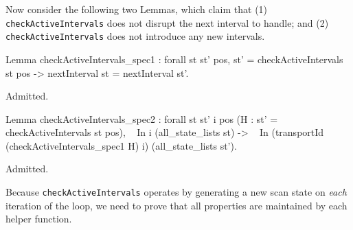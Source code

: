 \documentclass{llncs}
\newenvironment{MyCoqExampleStar}{\small \verbatim}{\endverbatim \normalsize}
\begin{document}



Now consider the following two Lemmas, which claim that (1)
\texttt{checkActiveIntervals} does not disrupt the next interval to handle;
and (2) \texttt{checkActiveIntervals} does not introduce any new intervals.


\begin{MyCoqExampleStar}
Lemma checkActiveIntervals_spec1 : forall st st' pos,
  st' = checkActiveIntervals st pos
    -> nextInterval st = nextInterval st'.
\end{MyCoqExampleStar}
\begin{MyCoqEval}
Admitted.
\end{MyCoqEval}

\begin{MyCoqExampleStar}
Lemma checkActiveIntervals_spec2 : forall st st' i pos
  (H : st' = checkActiveIntervals st pos),
  ~ In i (all_state_lists st)
    -> ~ In (transportId (checkActiveIntervals_spec1 H) i)
            (all_state_lists st').
\end{MyCoqExampleStar}
\begin{MyCoqEval}
Admitted.
\end{MyCoqEval}

Because \texttt{checkActiveIntervals} operates by generating a new scan state
on \emph{each} iteration of the loop, we need to prove that all properties are
maintained by each helper function.

\end{document}
